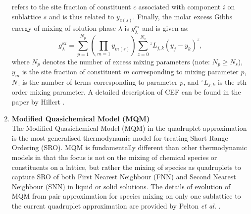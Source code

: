 \begin{enumerate}
refers to the site fraction of  constituent $c$ associated with component $i$ on sublattice $s$ and is thus
related to $y_{c(s)}$.  Finally, the molar excess Gibbs energy of mixing of solution phase $\lambda$ is
$g_{\lambda}^\text{ex}$ and is given as:
\begin{equation}
	\label{eq:g_ex}
	g_{\lambda}^\text{ex} = 	 \sum_{p=1}^{N_p} \left( \prod_{m=1} y_{m(s)}  \right)   \sum_{z=0}^{N_z} {^zL_{j,k}} (y_j - y_k)^{z},
\end{equation}
where $N_p$ denotes the number of excess mixing parameters (note: $N_p \ge N_s$), $y_m$ is the site fraction of constituent $m$ corresponding to mixing parameter $p$, $N_z$ is the number of terms corresponding to parameter $p$,  and ${^zL_{j,k}}$ is the $z$th order mixing parameter. A detailed description of CEF can be found in the paper by Hillert \cite{Hillert01}.
	\item \textbf{Modified Quasichemical Model (MQM)} \\
	The Modified Quasichemical Model (MQM) in the quadruplet approximation is the most generalised thermodynamic model for treating Short Range Ordering (SRO). MQM is fundamentally different than other thermodynamic models in that the focus is not on the mixing of chemical species or constituents on a lattice, but rather the mixing of species as quadruplets to capture SRO of both First Nearest Neighbour (FNN) and Second Nearest Neighbour (SNN) in liquid or solid solutions. The details of evolution of MQM from pair approximation for species mixing on only one sublattice to the current quadruplet approximation are provided by Pelton \textit{et al.} \cite{Pelton00,Pelton01,Chartrand01,Pelton01b}.


\end{enumerate}

